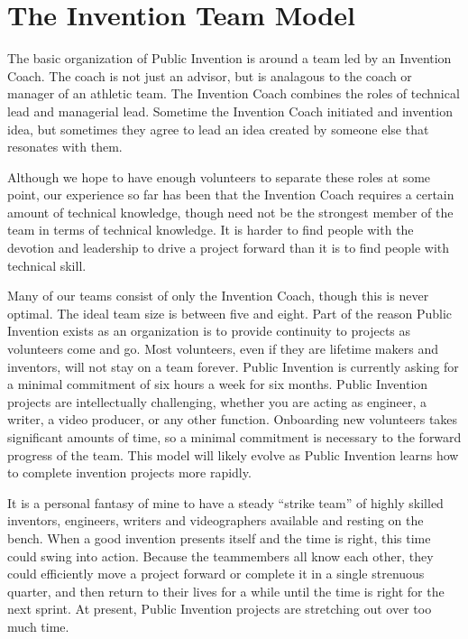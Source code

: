 \documentclass[
	fontsize=10pt, %
	twoside=false, %
	secnumdepth=1, %
]{kaobook}
\begin{document}
\chapter{The Invention Team Model}

The basic organization of Public Invention is around
a team led by an Invention Coach.
The coach is not just an advisor, but
is analagous to the coach or manager of an athletic team.
The Invention Coach combines the roles of technical lead
and managerial lead.
Sometime the Invention Coach initiated and invention idea,
but sometimes they agree to lead an idea created by someone else that resonates
with them.

Although we hope to have enough volunteers to separate these
roles at some point, our experience so far has been that
the Invention Coach requires a certain amount of technical
knowledge, though need not be the strongest member of the
team in terms of technical knowledge.
It is harder to find people with the devotion and leadership
to drive a project forward than it is to find people with
technical skill.

Many of our teams consist of only the Invention Coach,
though this is never optimal.
The ideal team size is between five and eight.
Part of the reason Public Invention exists as an
organization is to provide continuity to projects as
volunteers come and go.
Most volunteers, even if they are lifetime makers and
inventors, will not stay on a team forever.
Public Invention is currently asking for a minimal commitment
of six hours a week
for six months.
Public Invention projects are intellectually challenging,
whether you are acting as engineer, a writer, a video producer,
or any other function.
Onboarding new volunteers takes significant amounts of time,
so a minimal commitment is necessary to the forward progress of the team.
This model will likely evolve as Public Invention learns
how to complete invention projects more rapidly.

It is a personal fantasy of mine to have a steady ``strike team'' of
highly skilled inventors, engineers, writers and videographers
available and resting on the bench.
When a good invention presents itself and the time is right,
this time could swing into action.
Because the teammembers all know each other, they could
efficiently move a project forward or complete it in a single strenuous quarter,
and then return to their lives for a while until the time
is right for the next sprint.
At present, Public Invention projects are stretching out over too much time.
\end{document}
